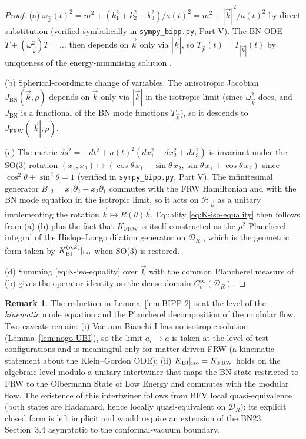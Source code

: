 \documentclass[11pt,a4paper]{article}
\theoremstyle{definition}
\newtheorem{remark}[theorem]{Remark}
\newcommand{\cH}{\mathcal{H}}
\newcommand{\cD}{\mathcal{D}}
\newcommand{\BI}{\mathrm{BI}}
\newcommand{\FRW}{\mathrm{FRW}}
\newcommand{\BN}{\mathrm{BN}}
\begin{document}
\begin{proof}
(a) $\omega_{\vec k}(t)^2 = m^2 + (k_1^2+k_2^2+k_3^2)/a(t)^2 = m^2+|\vec k|^2/a(t)^2$
by direct substitution (verified symbolically in
\texttt{sympy\_bipp.py}, Part V). The BN ODE
$\ddot T+(\omega_{\vec k}^2)T=\ldots$ then depends on $\vec k$ only via
$|\vec k|$, so $T_{\vec k}(t)=T_{|\vec k|}(t)$ by uniqueness of the
energy-minimising solution \cite[\S 3]{BN23}.

(b) Spherical-coordinate change of variables. The anisotropic
Jacobian $J_\BN(\vec k,\rho)$ depends on $\vec k$ only via $|\vec k|$
in the isotropic limit (since $\omega_{\vec k}^2$ does, and $J_\BN$ is a
functional of the BN mode functions $T_{\vec k}$), so it descends to
$J_\FRW(|\vec k|,\rho)$.

(c) The metric $ds^2=-dt^2+a(t)^2(dx_1^2+dx_2^2+dx_3^2)$ is invariant
under the SO(3)-rotation $(x_1,x_2)\mapsto(\cos\theta\, x_1-\sin\theta\, x_2,
\sin\theta\, x_1+\cos\theta\, x_2)$ since
$\cos^2\theta+\sin^2\theta=1$ (verified in \texttt{sympy\_bipp.py},
Part V). The infinitesimal generator $B_{12}=x_1\partial_2-x_2\partial_1$
commutes with the FRW Hamiltonian and with the BN mode equation in
the isotropic limit, so it acts on $\cH_{\vec k}$ as a unitary
implementing the rotation $\vec k\mapsto R(\theta)\vec k$. Equality
\eqref{eq:K-iso-equality} then follows from (a)-(b) plus the fact that
$K_\FRW$ is itself constructed as the $\rho^2$-Plancherel integral of
the Hislop--Longo dilation generator on $\cD_R$
\cite[Thm.~3.5]{ECI-FRW-note}, which is the geometric form taken by
$K_\BI^{(\rho,\vec k)}|_{\rm iso}$ when SO(3) is restored.

(d) Summing \eqref{eq:K-iso-equality} over $\vec k$ with the common
Plancherel measure of (b) gives the operator identity on the dense
domain $C_c^\infty(\cD_R)$.
\end{proof}

\begin{remark}\label{rem:BIPP2-scope}
The reduction in Lemma~\ref{lem:BIPP-2} is at the level of the
\emph{kinematic} mode equation and the Plancherel decomposition of the
modular flow. Two caveats remain:
(i) Vacuum Bianchi-I has no isotropic solution
(Lemma~\ref{lem:nogo-UBI}), so the limit $a_i\to a$ is taken at the
level of test configurations and is meaningful only for matter-driven
FRW (a kinematic statement about the Klein--Gordon ODE);
(ii) $K_\BI|_{\rm iso}=K_\FRW$ holds on the algebraic level
modulo a unitary intertwiner that maps the BN-state-restricted-to-FRW
to the Olbermann State of Low Energy and commutes with the modular
flow. The existence of this intertwiner follows from BFV local
quasi-equivalence \cite{BFV03} (both states are Hadamard, hence locally
quasi-equivalent on $\cD_R$); its explicit closed form is left
implicit and would require an extension of the BN23 Section~3.4
asymptotic to the conformal-vacuum boundary.
\end{remark}
\end{document}
